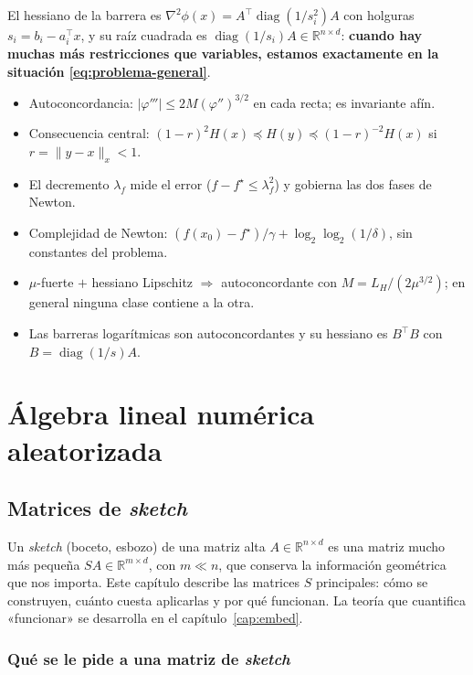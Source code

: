 \documentclass[11pt,a4paper,oneside]{book}
\theoremstyle{definition}
\theoremstyle{remark}
\newcommand{\R}{\mathbb{R}}
\newcommand{\T}{^{\top}}
\newcommand{\nrm}[1]{\lVert #1\rVert}
\newcommand{\abs}[1]{\left\lvert #1\right\rvert}
\DeclareMathOperator{\diag}{diag}
\newcommand{\lamf}{\lambda_f}
\newcommand{\LH}{L_{H}}
\begin{document}
El hessiano de la barrera es $\nabla^2\phi(x)=A\T\diag(1/s_i^2)A$ con holguras $s_i=b_i-a_i\T x$, y su raíz
cuadrada es $\diag(1/s_i)A\in\R^{n\times d}$: \textbf{cuando hay muchas más restricciones que variables,
estamos exactamente en la situación \eqref{eq:problema-general}}.

\begin{resumen}
\begin{itemize}
  \item Autoconcordancia: $\abs{\varphi'''}\le2M(\varphi'')^{3/2}$ en cada recta; es invariante afín.
  \item Consecuencia central: $(1-r)^2H(x)\preceq H(y)\preceq(1-r)^{-2}H(x)$ si $r=\nrm{y-x}_x<1$.
  \item El decremento $\lamf$ mide el error ($f-f^\star\le\lamf^2$) y gobierna las dos fases de Newton.
  \item Complejidad de Newton: $(f(x_0)-f^\star)/\gamma+\log_2\log_2(1/\delta)$, sin constantes del problema.
  \item $\mu$-fuerte $+$ hessiano Lipschitz $\Rightarrow$ autoconcordante con $M=\LH/(2\mu^{3/2})$; en general ninguna clase contiene a la otra.
  \item Las barreras logarítmicas son autoconcordantes y su hessiano es $B\T B$ con $B=\diag(1/s)A$.
\end{itemize}
\end{resumen}

\part{Álgebra lineal numérica aleatorizada}
\chapter{Matrices de \emph{sketch}}\label{cap:sketch}

Un \emph{sketch} (boceto, esbozo) de una matriz alta $A\in\R^{n\times d}$ es una matriz mucho más pequeña
$SA\in\R^{m\times d}$, con $m\ll n$, que conserva la información geométrica que nos importa. Este capítulo
describe las matrices $S$ principales: cómo se construyen, cuánto cuesta aplicarlas y por qué funcionan. La
teoría que cuantifica «funcionar» se desarrolla en el capítulo~\ref{cap:embed}.

\section{Qué se le pide a una matriz de \emph{sketch}}
\end{document}
